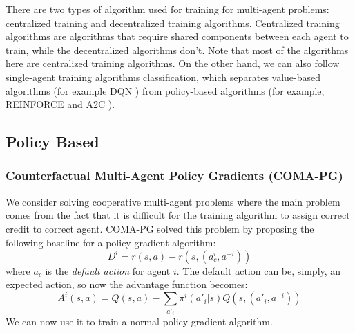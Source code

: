 \label{sec:chap2-deep-marl}

There are two types of algorithm used for training for multi-agent problems: centralized training and decentralized training algorithms. Centralized training algorithms are algorithms that require shared components between each agent to train, while the decentralized algorithms don't. Note that most of the algorithms here are centralized training algorithms. On the other hand, we can also follow single-agent training algorithms classification, which separates value-based algorithms (for example DQN \cite{mnih2015human}) from policy-based algorithms (for example, REINFORCE \cite{sutton2000policy} and A2C \cite{mnih2016asynchronous}). 

\subsection{Policy Based}

\subsubsection{Counterfactual Multi-Agent Policy Gradients (COMA-PG) \cite{foerster2018counterfactual}}
We consider solving cooperative multi-agent problems where the main problem comes from the fact that it is difficult for the training algorithm to assign correct credit to correct agent. COMA-PG \cite{foerster2018counterfactual} solved this problem by proposing the following baseline for a policy gradient algorithm:
\begin{equation}
    D^i = r(s, a) - r(s, (a_c^i, a^{-i}))
\end{equation}
where $a_c$ is the \textit{default action} for agent $i$. The default action can be, simply, an expected action, so now the advantage function becomes:
\begin{equation}
    A^i(s, a) = Q(s, a) - \sum_{a'_i} \pi^i(a'_i | s) Q(s, (a'_i,a^{-i}))
\end{equation}
We can now use it to train a normal policy gradient algorithm.

